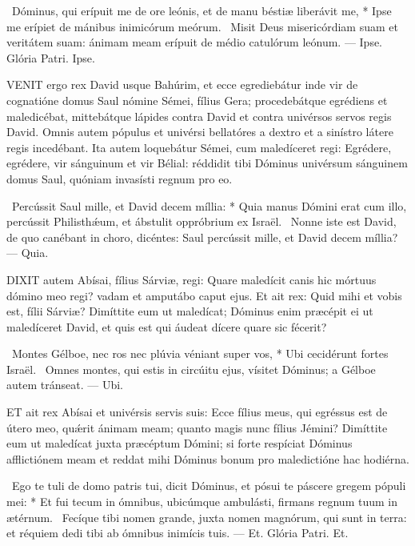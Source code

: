 \R\ Dóminus, qui erípuit me de ore leónis, et de manu béstiæ liberávit me, * Ipse me erípiet de mánibus inimicórum meórum. \V\ Misit Deus misericórdiam suam et veritátem suam: ánimam meam erípuit de médio catulórum leónum. --- Ipse. Glória Patri. Ipse.




\lettrine[lines=2]{V}{ENIT} ergo rex David usque Bahúrim, et ecce egrediebátur inde vir de cognatióne domus Saul nómine Sémei, fílius Gera; procedebátque egrédiens et maledicébat, mittebátque lápides contra David et contra univérsos servos regis David. Omnis autem pópulus et univérsi bellatóres a dextro et a sinístro látere regis incedébant. Ita autem loquebátur Sémei, cum maledíceret regi: Egrédere, egrédere, vir sánguinum et vir Bélial: réddidit tibi Dóminus univérsum sánguinem domus Saul, quóniam invasísti regnum pro eo.

\R\ Percússit Saul mille, et David decem míllia: * Quia manus Dómini erat cum illo, percússit Philisthǽum, et ábstulit oppróbrium ex Israël. \V\ Nonne iste est David, de quo canébant in choro, dicéntes: Saul percússit mille, et David decem míllia? --- Quia.


\lettrine[lines=2]{D}{IXIT} autem Abísai, fílius Sárviæ, regi: Quare maledícit canis hic mórtuus dómino meo regi? vadam et amputábo caput ejus. Et ait rex: Quid mihi et vobis est, fílii Sárviæ? Dimíttite eum ut maledícat; Dóminus enim præcépit ei ut maledíceret David, et quis est qui áudeat dícere quare sic fécerit?

\R\ Montes Gélboe, nec ros nec plúvia véniant super vos, * Ubi cecidérunt fortes Israël. \V\ Omnes montes, qui estis in circúitu ejus, vísitet Dóminus; a Gélboe autem tránseat. --- Ubi.



\lettrine[lines=2]{E}{T} ait rex Abísai et univérsis servis suis: Ecce fílius meus, qui egréssus est de útero meo, quǽrit ánimam meam; quanto magis nunc fílius Jémini? Dimíttite eum ut maledícat juxta præcéptum Dómini; si forte respíciat Dóminus afflictiónem meam et reddat mihi Dóminus bonum pro maledictióne hac hodiérna.

\R\ Ego te tuli de domo patris tui, dicit Dóminus, et pósui te páscere gregem pópuli mei: * Et fui tecum in ómnibus, ubicúmque ambulásti, firmans regnum tuum in ætérnum. \V\ Fecíque tibi nomen grande, juxta nomen magnórum, qui sunt in terra: et réquiem dedi tibi ab ómnibus inimícis tuis. --- Et. Glória Patri. Et.

